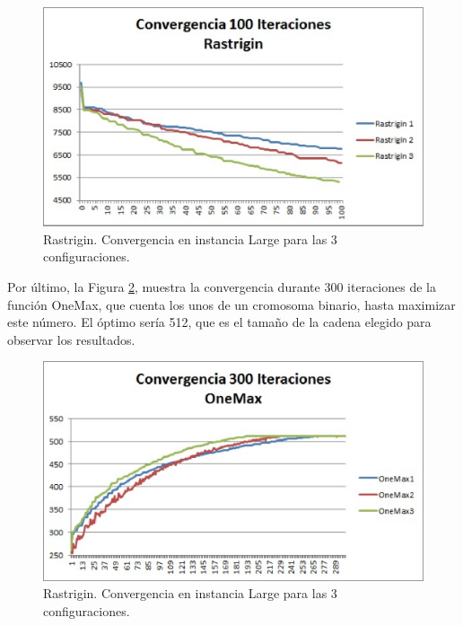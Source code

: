 \documentclass[runningheads]{llncs}
\begin{document}
\begin{figure}[h]
  \begin{center}
  \includegraphics[scale=0.7]{images/Rastrigin.eps}
  \caption {Rastrigin. Convergencia en instancia Large para las 3 configuraciones.} 
  \label{GraficaRastrigin}
 \end{center}
\end{figure}


Por último, la Figura \ref{GraficaOneMax}, muestra la convergencia durante 300 iteraciones de la función OneMax, que cuenta 
los unos de un cromosoma binario, hasta maximizar este número. El  óptimo sería 512, que es el tamaño de la cadena elegido 
para observar los resultados.

\begin{figure}[h]
  \begin{center}
  \includegraphics[scale=0.7]{images/OneMax.eps}
  \caption {Rastrigin. Convergencia en instancia Large para las 3 configuraciones.} 
  \label{GraficaOneMax}
 \end{center}
\end{figure}
\end{document}
